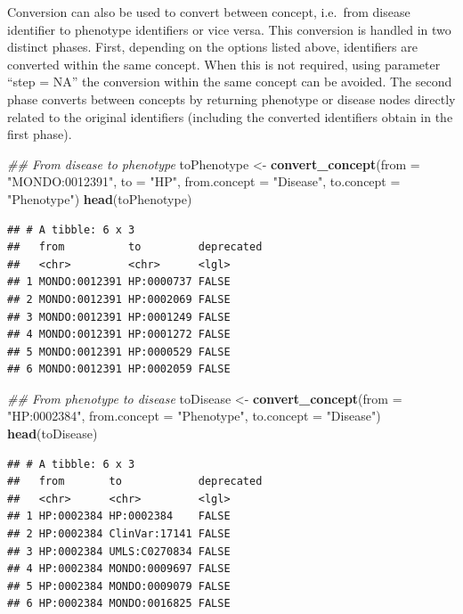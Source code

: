 \documentclass[9pt,a4paper,]{extarticle}
\newenvironment{Shaded}{\begin{snugshade}}{\end{snugshade}}
\newcommand{\CommentTok}[1]{\textcolor[rgb]{0.56,0.35,0.01}{\textit{#1}}}
\newcommand{\DataTypeTok}[1]{\textcolor[rgb]{0.13,0.29,0.53}{#1}}
\newcommand{\KeywordTok}[1]{\textcolor[rgb]{0.13,0.29,0.53}{\textbf{#1}}}
\newcommand{\NormalTok}[1]{#1}
\newcommand{\StringTok}[1]{\textcolor[rgb]{0.31,0.60,0.02}{#1}}
\begin{document}
Conversion can also be used to convert between concept, i.e.~from disease identifier to phenotype identifiers or vice versa. This conversion is handled in two distinct phases. First, depending on the options listed above, identifiers are converted within the same concept. When this is not required, using parameter ``step = NA'' the conversion within the same concept can be avoided. The second phase converts between concepts by returning phenotype or disease nodes directly related to the original identifiers (including the converted identifiers obtain in the first phase).

\begin{Shaded}
\begin{Highlighting}[]
\CommentTok{## From disease to phenotype}
\NormalTok{toPhenotype <-}\StringTok{ }\KeywordTok{convert_concept}\NormalTok{(}\DataTypeTok{from =} \StringTok{"MONDO:0012391"}\NormalTok{,}
                               \DataTypeTok{to =} \StringTok{"HP"}\NormalTok{,}
                               \DataTypeTok{from.concept =} \StringTok{"Disease"}\NormalTok{,}
                               \DataTypeTok{to.concept =} \StringTok{"Phenotype"}\NormalTok{) }
\KeywordTok{head}\NormalTok{(toPhenotype)}
\end{Highlighting}
\end{Shaded}

\begin{verbatim}
## # A tibble: 6 x 3
##   from          to         deprecated
##   <chr>         <chr>      <lgl>     
## 1 MONDO:0012391 HP:0000737 FALSE     
## 2 MONDO:0012391 HP:0002069 FALSE     
## 3 MONDO:0012391 HP:0001249 FALSE     
## 4 MONDO:0012391 HP:0001272 FALSE     
## 5 MONDO:0012391 HP:0000529 FALSE     
## 6 MONDO:0012391 HP:0002059 FALSE
\end{verbatim}

\begin{Shaded}
\begin{Highlighting}[]
\CommentTok{## From phenotype to disease}
\NormalTok{toDisease <-}\StringTok{ }\KeywordTok{convert_concept}\NormalTok{(}\DataTypeTok{from =} \StringTok{"HP:0002384"}\NormalTok{,}
                               \DataTypeTok{from.concept =} \StringTok{"Phenotype"}\NormalTok{,}
                               \DataTypeTok{to.concept =} \StringTok{"Disease"}\NormalTok{) }
\KeywordTok{head}\NormalTok{(toDisease)}
\end{Highlighting}
\end{Shaded}

\begin{verbatim}
## # A tibble: 6 x 3
##   from       to            deprecated
##   <chr>      <chr>         <lgl>     
## 1 HP:0002384 HP:0002384    FALSE     
## 2 HP:0002384 ClinVar:17141 FALSE     
## 3 HP:0002384 UMLS:C0270834 FALSE     
## 4 HP:0002384 MONDO:0009697 FALSE     
## 5 HP:0002384 MONDO:0009079 FALSE     
## 6 HP:0002384 MONDO:0016825 FALSE
\end{verbatim}
\end{document}
